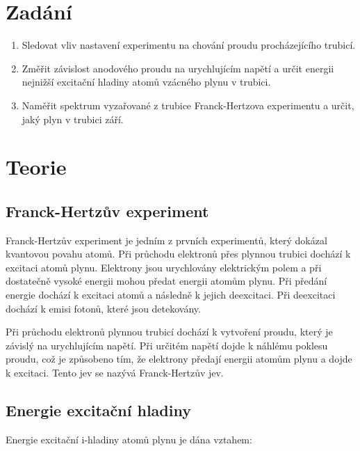 \documentclass[a4paper,11pt]{article}
\begin{document}
\vskip10pt
    \begin{minipage}[t]{0.5\textwidth} 
        \section{Zadání}    
            \begin{enumerate}
                \item Sledovat vliv nastavení experimentu na chování proudu procházejícího trubicí.
                \item Změřit závislost anodového proudu na urychlujícím napětí a určit energii nejnižší excitační
                hladiny atomů vzácného plynu v trubici.
                \item Naměřit spektrum vyzařované z trubice Franck-Hertzova experimentu a určit, jaký plyn
                v trubici září.
            \end{enumerate}
        \section{Teorie}
            \subsection{Franck-Hertzův experiment}
                \par Franck-Hertzův experiment je jedním z prvních experimentů, který dokázal kvantovou povahu atomů. Při průchodu elektronů přes plynnou trubici dochází k excitaci atomů plynu. Elektrony jsou urychlovány elektrickým polem a při dostatečně vysoké energii mohou předat energii atomům plynu. Při předání energie dochází k excitaci atomů a následně k jejich deexcitaci. Při deexcitaci dochází k emisi fotonů, které jsou detekovány. 
                \par Při průchodu elektronů plynnou trubicí dochází k vytvoření proudu, který je závislý na urychlujícím napětí. Při určitém napětí dojde k náhlému poklesu proudu, což je způsobeno tím, že elektrony předají energii atomům plynu a dojde k excitaci. Tento jev se nazývá Franck-Hertzův jev.
            \subsection{Energie excitační hladiny}
                \par Energie excitační i-hladiny atomů plynu je dána vztahem:
    \end{minipage}
    \hspace{10pt}
\end{document}
